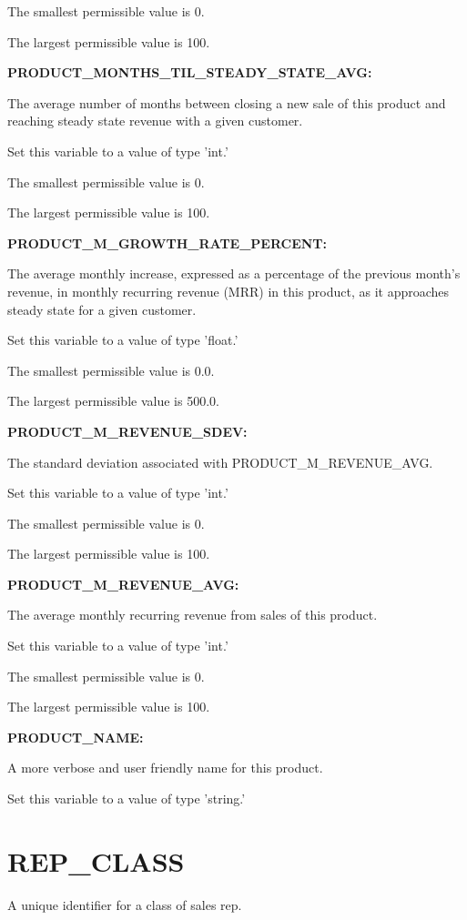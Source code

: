 The smallest permissible value is 0.

The largest permissible value is 100.


\textbf{PRODUCT\_MONTHS\_TIL\_STEADY\_STATE\_AVG:}


The average number of months between closing a new sale of this product and reaching steady state revenue with a given customer.

Set this variable to a value of type 'int.'

The smallest permissible value is 0.

The largest permissible value is 100.


\textbf{PRODUCT\_M\_GROWTH\_RATE\_PERCENT:}


The average monthly increase, expressed as a percentage of the previous month's revenue, in monthly recurring revenue (MRR) in this product, as it approaches steady state for a given customer.

Set this variable to a value of type 'float.'

The smallest permissible value is 0.0.

The largest permissible value is 500.0.


\textbf{PRODUCT\_M\_REVENUE\_SDEV:}


The standard deviation associated with PRODUCT\_M\_REVENUE\_AVG.

Set this variable to a value of type 'int.'

The smallest permissible value is 0.

The largest permissible value is 100.


\textbf{PRODUCT\_M\_REVENUE\_AVG:}


The average monthly recurring revenue from sales of this product.

Set this variable to a value of type 'int.'

The smallest permissible value is 0.

The largest permissible value is 100.


\textbf{PRODUCT\_NAME:}


A more verbose and user friendly name for this product.

Set this variable to a value of type 'string.'


\section{REP\_CLASS}


A unique identifier for a class of sales rep.

